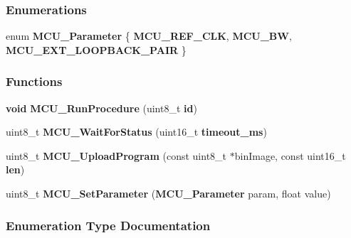 \subsubsection*{Enumerations}
\begin{DoxyCompactItemize}
\item 
enum {\bf M\+C\+U\+\_\+\+Parameter} \{ {\bf M\+C\+U\+\_\+\+R\+E\+F\+\_\+\+C\+LK}, 
{\bf M\+C\+U\+\_\+\+BW}, 
{\bf M\+C\+U\+\_\+\+E\+X\+T\+\_\+\+L\+O\+O\+P\+B\+A\+C\+K\+\_\+\+P\+A\+IR}
 \}
\end{DoxyCompactItemize}
\subsubsection*{Functions}
\begin{DoxyCompactItemize}
\item 
{\bf void} {\bf M\+C\+U\+\_\+\+Run\+Procedure} (uint8\+\_\+t {\bf id})
\item 
uint8\+\_\+t {\bf M\+C\+U\+\_\+\+Wait\+For\+Status} (uint16\+\_\+t {\bf timeout\+\_\+ms})
\item 
uint8\+\_\+t {\bf M\+C\+U\+\_\+\+Upload\+Program} (const uint8\+\_\+t $\ast$bin\+Image, const uint16\+\_\+t {\bf len})
\item 
uint8\+\_\+t {\bf M\+C\+U\+\_\+\+Set\+Parameter} ({\bf M\+C\+U\+\_\+\+Parameter} param, float value)
\end{DoxyCompactItemize}


\subsubsection{Enumeration Type Documentation}
